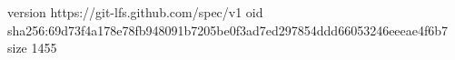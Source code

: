 version https://git-lfs.github.com/spec/v1
oid sha256:69d73f4a178e78fb948091b7205be0f3ad7ed297854ddd66053246eeeae4f6b7
size 1455
